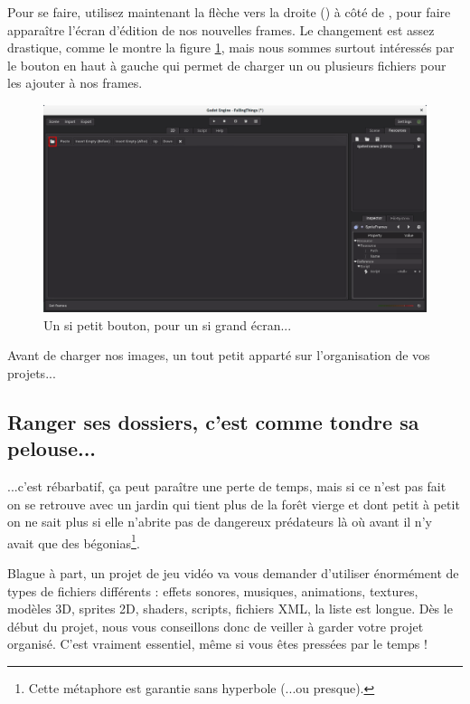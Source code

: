 Pour se faire, utilisez maintenant la flèche vers la droite (\codeintext{>}) à côté de , pour faire apparaître l'écran d'édition de nos nouvelles frames. Le changement est assez drastique, comme le montre la figure \ref{lvl1-addframes}, mais nous sommes surtout intéressés par le bouton en haut à gauche qui permet de charger un ou plusieurs fichiers pour les ajouter à nos frames.

\begin{figure}
  \begin{center}
    \includegraphics[width=12cm]{img/lvl1-addframes.png}
  \end{center}
  \caption{\label{lvl1-addframes} Un si petit bouton, pour un si grand écran...}
\end{figure}

Avant de charger nos images, un tout petit apparté sur l'organisation de vos projets...

\subsection{Ranger ses dossiers, c'est comme tondre sa pelouse...}

...c'est rébarbatif, ça peut paraître une perte de temps, mais si ce n'est pas fait on se retrouve avec un jardin qui tient plus de la forêt vierge et dont petit à petit on ne sait plus si elle n'abrite pas de dangereux prédateurs là où avant il n'y avait que des bégonias\footnote{Cette métaphore est garantie sans hyperbole (...ou presque).}.

Blague à part, un projet de jeu vidéo va vous demander d'utiliser énormément de types de fichiers différents : effets sonores, musiques, animations, textures, modèles 3D, sprites 2D, shaders, scripts, fichiers XML, la liste est longue. Dès le début du projet, nous vous conseillons donc de veiller à garder votre projet organisé. C'est vraiment essentiel, même si vous êtes pressées par le temps !

